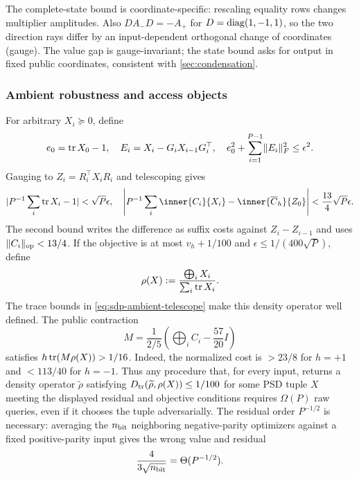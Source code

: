 The complete-state bound is coordinate-specific: rescaling equality rows
changes multiplier amplitudes.  Also $D A_-D=-A_+$
for $D=\operatorname{diag}(1,-1,1)$, so the two direction rays differ by an input-dependent
orthogonal change of coordinates (gauge).  The value gap is gauge-invariant;
the state bound asks for output in fixed public coordinates, consistent with \cref{sec:condensation}.

\subsubsection{Ambient robustness and access objects}
\label{sec:sdp-intrinsic-access}

For arbitrary $X_i\succeq0$, define
\begin{equation}
 e_0=\operatorname{tr} X_0-1,\quad E_i=X_i-G_iX_{i-1}G_i^\top,\quad
 e_0^2+\sum_{i=1}^{P-1}\lVert E_i\rVert_F^2\leq\epsilon^2.       \label{eq:sdp-ambient-residual}
\end{equation}
Gauging to $Z_i=R_i^\top X_iR_i$ and telescoping gives
\begin{equation}
 |P^{-1}\sum_i\tr X_i-1|<\sqrt P\epsilon,\quad
 \left|P^{-1}\sum_i\inner{C_i}{X_i}-\inner{\overline C_h}{Z_0}\right|
 <\frac{13}{4}\sqrt P\epsilon.                            \label{eq:sdp-ambient-telescope}
\end{equation}
The second bound writes the difference as suffix costs against
$Z_i-Z_{i-1}$ and uses $\lVert C_i\rVert_{\rm op}<13/4$.  If the
objective is at most $v_h+1/100$ and
$\epsilon\leq1/(400\sqrt P)$, define
\begin{equation}
 \rho(X):=\frac{\bigoplus_iX_i}{\sum_i\operatorname{tr} X_i}.             \label{eq:sdp-ambient-density}
\end{equation}
The trace bounds in \eqref{eq:sdp-ambient-telescope} make this density
operator well defined.  The public contraction
\begin{equation}
 M=\frac1{2/5}\left(\bigoplus_iC_i-\frac{57}{20}I\right)
\end{equation}
satisfies $h\operatorname{tr}(M\rho(X))>1/16$.  Indeed, the normalized cost is
$>23/8$ for $h=+1$ and $<113/40$ for $h=-1$.  Thus any procedure that,
for every input, returns a density operator $\widetilde\rho$ satisfying
$D_{\mathrm{tr}}(\widetilde\rho,\rho(X))\leq1/100$ for some PSD tuple $X$ meeting the
displayed residual and objective conditions requires $\Omega(P)$ raw
queries, even if it chooses the tuple adversarially.  The residual
order $P^{-1/2}$ is necessary: averaging the
$n_{\rm bit}$ neighboring negative-parity optimizers against a fixed
positive-parity input gives the wrong value and residual
\begin{equation}
 \frac4{3\sqrt{n_{\rm bit}}}=\Theta(P^{-1/2}).              \label{eq:sdp-wrong-parity-witness}
\end{equation}

